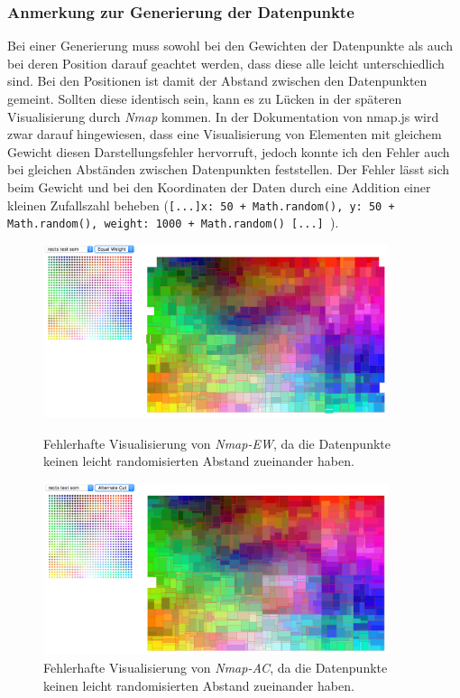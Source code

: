 \documentclass[12pt, ngerman, utf8]{article}
\begin{document}
\subsubsection{Anmerkung zur Generierung der Datenpunkte}
Bei einer Generierung muss sowohl bei den Gewichten der Datenpunkte als auch bei deren Position darauf geachtet werden, dass diese alle leicht unterschiedlich sind. Bei den Positionen ist damit der Abstand zwischen den Datenpunkten gemeint. Sollten diese identisch sein, kann es zu Lücken in der späteren Visualisierung durch \emph{Nmap} kommen. In der Dokumentation von nmap.js wird zwar darauf hingewiesen, dass eine Visualisierung von Elementen mit gleichem Gewicht diesen Darstellungsfehler hervorruft, jedoch konnte ich den Fehler auch bei gleichen Abständen zwischen Datenpunkten feststellen. Der Fehler lässt sich beim Gewicht und bei den Koordinaten der Daten durch eine Addition einer kleinen Zufallszahl beheben (\texttt{[...]x: 50 + Math.random(), y: 50 + Math.random(), weight: 1000 + Math.random() [...] }).
\begin{figure}[h]
\centering
\begin{minipage}{.45\textwidth}
  \centering
  \includegraphics[width=0.9\textwidth]{./imgs/nmap-ew_fehler.png}
  \caption{Fehlerhafte Visualisierung von \emph{Nmap-EW}, da die Datenpunkte keinen leicht randomisierten Abstand zueinander haben.}
  \label{fig:nmap-ew-fehler}
\end{minipage}%
\hfill
\begin{minipage}{.45\textwidth}
  \centering
  \includegraphics[width=0.9\textwidth]{./imgs/nmap-ac_fehler.png}
  \caption{Fehlerhafte Visualisierung von \emph{Nmap-AC}, da die Datenpunkte keinen leicht randomisierten Abstand zueinander haben.}
  \label{fig:nmap-ac-fehler}
\end{minipage}
\end{figure}
\end{document}

